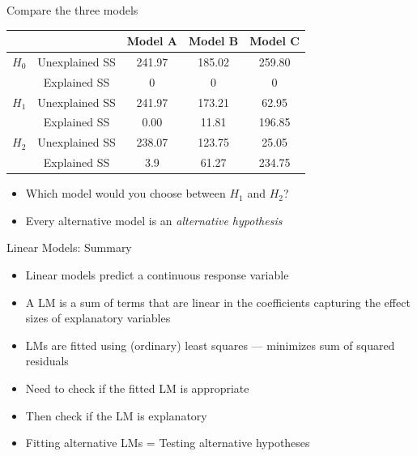 \documentclass[xcolor=x11names,compress]{beamer}
\renewcommand{\(}{\begin{columns}}
\renewcommand{\)}{\end{columns}}
\newcommand{\<}[1]{\begin{column}{#1}}
\renewcommand{\>}{\end{column}}
\begin{document}

\begin{frame}{Compare the three models}

\begin{table}[htdp]
	\begin{center}
		\begin{tabular}{ccccc}
				&  & Model A & Model B & Model C \\
		\hline
		$H_0 $ & Unexplained SS & 241.97 & 185.02 & 259.80 \\
		       & Explained SS   & 0      & 0      &    0   \\
		$H_1 $ & Unexplained SS & 241.97 & 173.21 & 62.95 \\
		       & Explained SS   & 0.00  & 11.81 & 196.85 \\
		$H_2 $ & Unexplained SS & 238.07 & 123.75 & 25.05 \\
		       & Explained SS   & 3.9  & 61.27 & 234.75 \\
        \hline
    \end{tabular}
\end{center}
\end{table}

\begin{itemize}[<+->]\itemsep6pt
    \item Which model would you choose between $H_1$ and $H_2$?
    \item Every alternative model is an {\it alternative hypothesis}
\end{itemize}
    
\end{frame}


\begin{frame}{Linear Models: Summary}

    \begin{itemize}\itemsep12pt
        \item Linear models predict a continuous response variable
        \item A LM is a sum of terms that are linear in the coefficients capturing the effect sizes of explanatory variables
        \item LMs are fitted using (ordinary) least squares --- minimizes sum of squared residuals
        \item Need to check if the fitted LM is appropriate
        \item Then check if the LM is explanatory
        \item Fitting alternative LMs = Testing alternative hypotheses
    \end{itemize}
    
    \end{frame}
    
\end{document}
